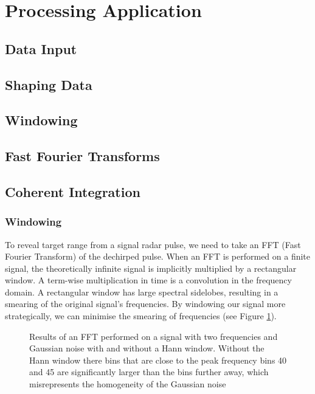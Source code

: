 \section{Processing Application}
\label{sec:processing_app}
\subsection{Data Input}
\subsection{Shaping Data}
\subsection{Windowing}
\subsection{Fast Fourier Transforms}
\subsection{Coherent Integration}

\subsubsection{Windowing}
To reveal target range from a signal radar pulse, we need to take an FFT (Fast Fourier Transform) of the dechirped pulse. When an FFT is performed on a finite signal, the theoretically infinite signal is implicitly multiplied by a rectangular window. A term-wise multiplication in time is a convolution in the frequency domain. A rectangular window has large spectral sidelobes, resulting in a smearing of the original signal's frequencies. By windowing our signal more strategically, we can minimise the smearing of frequencies (see Figure \ref{fig:hann filter}). \\

\begin{figure}
    \centering
    
    \caption{Results of an FFT performed on a signal with two frequencies and Gaussian noise with and without a Hann window. Without the Hann window there bins that are close to the peak frequency bins 40 and 45 are significantly larger than the bins further away, which misrepresents the homogeneity of the Gaussian noise}
    \label{fig:hann filter}
\end{figure}


